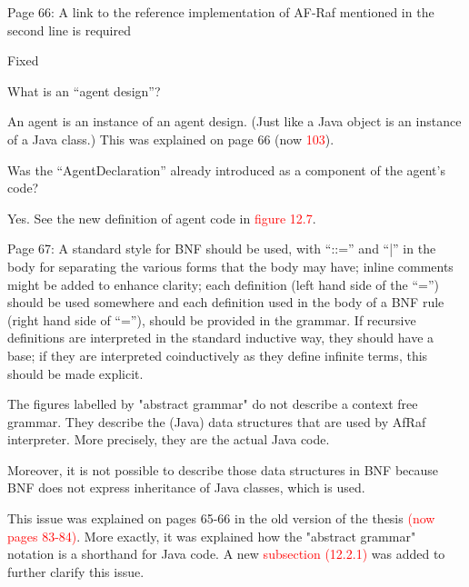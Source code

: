 \documentclass{article}
\newcommand*\R[1]{\textcolor{red}{#1}} %
\newenvironment{them}{\noindent\begingroup\color{blue}}{\endgroup\par}
\begin{document}
\begin{them}

Page 66:
A link to the reference implementation of AF-Raf mentioned in the second line
is required

\end{them}
Fixed

\begin{them}

What is an ``agent design''? 

\end{them}

An agent is an instance of an agent design.
(Just like a Java object is an instance of a Java class.)
This was explained on page 66 (now \R{103}).

\begin{them}

Was the “AgentDeclaration” already introduced as a component of the agent's
code?

\end{them}
Yes. See the new definition of agent code in \R{figure 12.7}.

\begin{them}

Page 67:
A standard style for BNF should be used, with “::=” and “|” in the body for
separating the various forms that the body may have; inline comments might be
added to enhance clarity; each definition (left hand side of the “=”) should be
used somewhere and each definition used in the body of a BNF rule (right hand
side of “=”), should be provided in the grammar. If recursive definitions are
interpreted in the standard inductive way, they should have a base; if they are
interpreted coinductively as they define infinite terms, this should be made
explicit. 

\end{them}
The figures labelled by "abstract grammar" do not describe a context free
grammar. They describe the (Java) data structures that are used by AfRaf
interpreter. More precisely, they are the actual Java code.

Moreover, it is not possible to describe those data structures in BNF because
BNF does not express inheritance of Java classes, which is used.

This issue was explained on pages 65-66 in the old version of the thesis
\R{(now pages 83-84)}. More exactly, it was explained how the "abstract
grammar" notation is a shorthand for Java code. A new \R{subsection (12.2.1)}
was added to further clarify this issue. 
\end{document}
